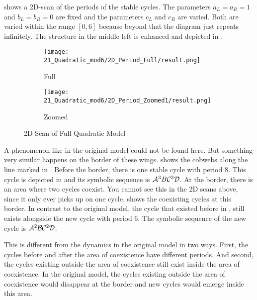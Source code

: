  shows a 2D-scan of the periods of the stable cycles.
The parameters $a_L = a_R = 1$ and $b_L = b_R = 0$ are fixed and the parameters $c_L$ and $c_R$ are varied.
Both are varied within the range $[0, 6]$ because beyond that the diagram just repeats infinitely.
The structure in the middle left is enhanced and depicted in .

\begin{figure}
    \centering
    \begin{subfigure}{0.4\textwidth}
        \centering
        \texttt{[image: 21\_Quadratic\_mod6/2D\_Period\_Full/result.png]}
        \caption{Full}
        \label{fig:quadratic.full.2d.full}
    \end{subfigure}
    \begin{subfigure}{0.4\textwidth}
        \centering
        \texttt{[image: 21\_Quadratic\_mod6/2D\_Period\_Zoomed1/result.png]}
        \caption{Zoomed}
        \label{fig:quadratic.full.2d.z1}
    \end{subfigure}
    \caption{2D Scan of Full Quadratic Model}
\end{figure}

A phenomenon like in the original model could not be found here.
But something very similar happens on the border of these wings.
 shows the cobwebs along the line marked in .
Before the border, there is one stable cycle with period 8.
This cycle is depicted in  and its symbolic sequence is $\mathcal{A}^3B\mathcal{C}^3\mathcal{D}$.
At the border, there is an area where two cycles coexist.
You cannot see this in the 2D scans above, since it only ever picks up on one cycle.
 shows the coexisting cycles at this border.
In contrast to the original model, the cycle that existed before in , still exists alongside the new cycle with period 6.
The symbolic sequence of the new cycle is $\mathcal{A}^2\mathcal{B}\mathcal{C}^2\mathcal{D}$.

This is different from the dynamics in the original model in two ways.
First, the cycles before and after the area of coexistence have different periods.
And second, the cycles existing outside the area of coexistence still exist inside the area of coexistence.
In the original model, the cycles existing outside the area of coexistence would disappear at the border and new cycles would emerge inside this area.

